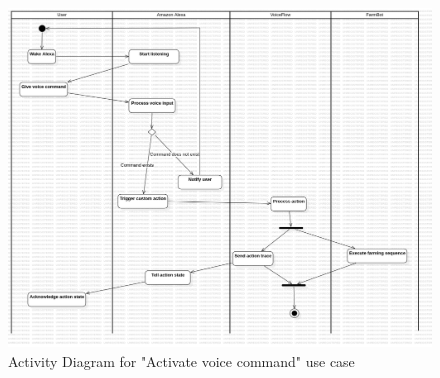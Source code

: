\begin{figure}[H]
    \centering
    \includegraphics[width=1\textwidth]{UML Diagrams/ActivityDiagram_activatevoicecommand.png}
    \caption{Activity Diagram for "Activate voice command" use case}
    \label{fig:activity-diagram-activate-voice-command}
\end{figure}

